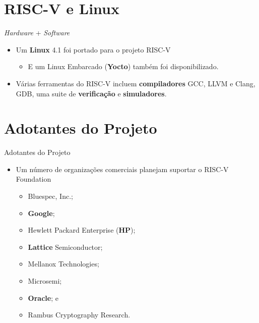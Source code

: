 \documentclass[red, aspectratio=169, xcolor=dvipsnames]{beamer}
\let\olditem=\item%
\renewcommand{\item}{\olditem \justifying}
\begin{document}
\section{RISC-V e Linux}
\begin{frame}{\textit{Hardware} + \textit{Software}}
	\begin{itemize}
		\setlength{\itemsep}{1.7em}
		\item Um \textbf{Linux} 4.1 foi portado para o projeto RISC-V
		\begin{itemize}
			\item E um Linux Embarcado (\textbf{Yocto}) também foi disponibilizado.
		\end{itemize}
	
		\item Várias ferramentas do RISC-V incluem \textbf{compiladores} GCC, LLVM e Clang, GDB, uma suite de \textbf{verificação} e \textbf{simuladores}.

		
	\end{itemize}
\end{frame}

\section{Adotantes do Projeto}

\begin{frame}{Adotantes do Projeto}
	\begin{itemize}
		\setlength{\itemsep}{1.5em}
		\item Um número de organizações comerciais planejam suportar o RISC-V Foundation
		\begin{itemize}
			\setlength{\itemsep}{1em}
			\item Bluespec, Inc.;
			\item \textbf{Google};
			\item Hewlett Packard Enterprise (\textbf{HP});
			\item \textbf{Lattice} Semiconductor;
			\item Mellanox Technologies;
			\item Microsemi;
			\item \textbf{Oracle}; e
			\item Rambus Cryptography Research.
		\end{itemize}
	\end{itemize}
\end{frame}
\end{document}
